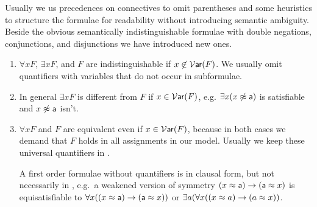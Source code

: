 \begin{remark}Usually we us precedences on connectives to omit parentheses 
	and some heuristics to structure the formulae for readability 
	without introducing semantic ambiguity.
%
	Beside the obvious semantically indistinguishable formulae with double negations, conjunctions, and disjunctions 
	we have introduced new ones.
	\begin{enumerate}
		\item $\forall x F$, $\exists x F$, and $F$ are indistinguishable if $x\not\in\operatorname{\mathcal{V}\mathsf{ar}}(F)$. 
		We usually omit quantifiers with variables that do not occur in subformulae.
		\item In general $\exists x F$ is different from $F$ if $x\in\operatorname{\mathcal{V}\mathsf{ar}}(F)$, e.g. $\exists x(x\not\approx{\mathsf a})$ is satisfiable and $x\not\approx{\mathsf a}$ isn't.
		\item $\forall x F$ and $F$ are equivalent even if $x\in\operatorname{\mathcal{V}\mathsf{ar}}(F)$, 
		because in both cases we demand that $F$ holds in all assignments in our model.
		Usually we keep these universal quantifiers in \FOF.
		
		A first order formulae without quantifiers is in {\myem clausal form}, 
		but not necessarily in \CNF, e.g.~a weakened version of symmetry $(x\approx {\mathsf a})\rightarrow ({\mathsf a}\approx x)$ 
		is equisatisfiable to $\forall x ((x\approx {\mathsf a})\rightarrow ({\mathsf a}\approx x))$ 
		or $\exists a (\forall x ((x\approx a)\rightarrow (a\approx x))$. 
	\end{enumerate}

\end{remark}